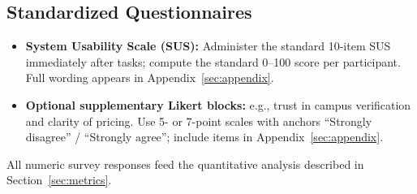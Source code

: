 \subsection{Standardized Questionnaires}

\begin{itemize}
  \item \textbf{System Usability Scale (SUS):} Administer the standard 10-item SUS immediately after tasks; compute the standard 0--100 score per participant. Full wording appears in Appendix~\ref{sec:appendix}.
  \item \textbf{Optional supplementary Likert blocks:} e.g., trust in campus verification and clarity of pricing. Use 5- or 7-point scales with anchors ``Strongly disagree'' / ``Strongly agree''; include items in Appendix~\ref{sec:appendix}.
\end{itemize}

All numeric survey responses feed the quantitative analysis described in Section~\ref{sec:metrics}.
